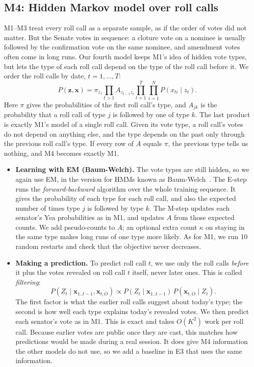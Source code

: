 \documentclass[10pt]{article}
\begin{document}
\subsection{M4: Hidden Markov model over roll calls}
M1--M3 treat every roll call as a separate sample, as if the order of votes did not matter. But the Senate votes in sequence: a cloture vote on a nominee is usually followed by the confirmation vote on the same nominee, and amendment votes often come in long runs. Our fourth model keeps M1's idea of hidden vote types, but lets the type of each roll call depend on the type of the roll call before it. We order the roll calls by date, $t=1,\dots,T$:
\begin{equation}
P(\mathbf z,\mathbf x)=\pi_{z_1}\prod_{t>1}A_{z_{t-1}z_t}\prod_{t=1}^{T}\prod_{i=1}^{N}P(x_{ti}\mid z_t).
\end{equation}
Here $\pi$ gives the probabilities of the first roll call's type, and $A_{jk}$ is the probability that a roll call of type $j$ is followed by one of type $k$. The last product is exactly M1's model of a single roll call. Given its vote type, a roll call's votes do not depend on anything else, and the type depends on the past only through the previous roll call's type. If every row of $A$ equals $\pi$, the previous type tells us nothing, and M4 becomes exactly M1.
\begin{itemize}
\item \textbf{Learning with EM (Baum-Welch).} The vote types are still hidden, so we again use EM, in the version for HMMs known as Baum-Welch~\cite{rabiner1989}. The E-step runs the \emph{forward-backward} algorithm over the whole training sequence. It gives the probability of each type for each roll call, and also the expected number of times type $j$ is followed by type $k$. The M-step updates each senator's Yea probabilities as in M1, and updates $A$ from those expected counts. We add pseudo-counts to $A$; an optional extra count $\kappa$ on staying in the same type makes long runs of one type more likely. As for M1, we run 10 random restarts and check that the objective never decreases.
\item \textbf{Making a prediction.} To predict roll call $t$, we use only the roll calls \emph{before} it plus the votes revealed on roll call $t$ itself, never later ones. This is called \emph{filtering}:
\begin{equation}
P(Z_t\mid\mathbf x_{1..t-1},\mathbf x_{t,O})\propto P(Z_t\mid\mathbf x_{1..t-1})\,P(\mathbf x_{t,O}\mid Z_t).
\end{equation}
The first factor is what the earlier roll calls suggest about today's type; the second is how well each type explains today's revealed votes. We then predict each senator's vote as in M1. This is exact and takes $O(K^2)$ work per roll call. Because earlier votes are public once they are cast, this matches how predictions would be made during a real session. It does give M4 information the other models do not use, so we add a baseline in E3 that uses the same information.
\end{itemize}
\end{document}
